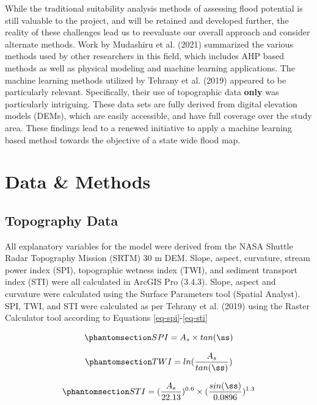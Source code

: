 \documentclass[
]{agujournal2019}
\begin{document}
While the traditional suitability analysis methods of assessing flood
potential is still valuable to the project, and will be retained and
developed further, the reality of these challenges lead us to reevaluate
our overall approach and consider alternate methods. Work by Mudashiru
et al. (2021) summarized the various methods used by other researchers
in this field, which includes AHP based methods as well as physical
modeling and machine learning applications. The machine learning methods
utilized by Tehrany et al. (2019) appeared to be particularly relevant.
Specifically, their use of topographic data \textbf{only} was
particularly intriguing. These data sets are fully derived from digital
elevation models (DEMs), which are easily accessible, and have full
coverage over the study area. These findings lead to a renewed
initiative to apply a machine learning based method towards the
objective of a state wide flood map.

\section{Data \& Methods}\label{sec-data-methods}

\subsection{Topography Data}\label{topography-data}

All explanatory variables for the model were derived from the NASA
Shuttle Radar Topography Mission (SRTM) 30 m DEM. Slope, aspect,
curvature, stream power index (SPI), topographic wetness index (TWI),
and sediment transport index (STI) were all calculated in ArcGIS Pro
(3.4.3). Slope, aspect and curvature were calculated using the Surface
Parameters tool (Spatial Analyst). SPI, TWI, and STI were calculated as
per Tehrany et al. (2019) using the Raster Calculator tool according to
Equations \ref{eq-spi}-\ref{eq-sti}

\begin{equation}\phantomsection\label{eq-spi}{
SPI = A_s \times tan(ß)
}\end{equation}

\begin{equation}\phantomsection\label{eq-twi}{
TWI = ln(\frac{A_s}{tan(ß)})
}\end{equation}

\begin{equation}\phantomsection\label{eq-sti}{
STI = (\frac{A_s}{22.13})^{0.6} \times (\frac{sin(ß)}{0.0896})^{1.3}
}\end{equation}
\end{document}
